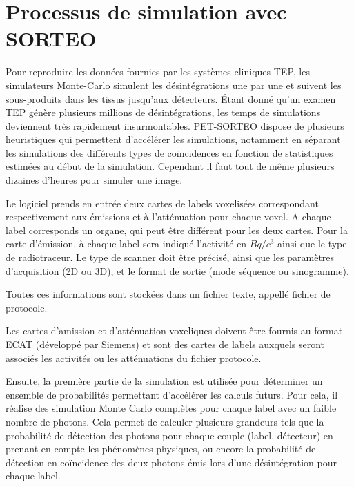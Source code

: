 	\section{Processus de simulation avec SORTEO}

Pour reproduire les données fournies par les systèmes cliniques TEP, les simulateurs Monte-Carlo simulent les désintégrations une par une et suivent les sous-produits dans les tissus jusqu'aux détecteurs. Étant donné qu'un examen TEP génère plusieurs millions de désintégrations, les temps de simulations deviennent très rapidement insurmontables. PET-SORTEO dispose de plusieurs heuristiques qui permettent d'accélérer les simulations, notamment en séparant les simulations des différents types de coïncidences en fonction de statistiques estimées au début de la simulation. Cependant il faut tout de même plusieurs dizaines d'heures pour simuler une image.

Le logiciel prends en entrée deux cartes de labels voxelisées correspondant respectivement aux émissions et à l'atténuation pour chaque voxel. A chaque label corresponds un organe, qui peut être différent pour les deux cartes. Pour la carte d'émission, à chaque label sera indiqué l'activité en $Bq/c^3$ ainsi que le type de radiotraceur. Le type de scanner doit être précisé, ainsi que les paramètres d'acquisition (2D ou 3D), et le format de sortie (mode séquence ou sinogramme).

Toutes ces informations sont stockées dans un fichier texte, appellé fichier de protocole.

Les cartes d'amission et d'atténuation voxeliques doivent être fournis au format ECAT (développé par Siemens) et sont des cartes de labels auxquels seront associés les activités ou les atténuations du fichier protocole.

Ensuite, la première partie de la simulation est utilisée pour déterminer un ensemble de probabilités permettant d'accélérer les calculs futurs. Pour cela, il réalise des simulation Monte Carlo complètes pour chaque label avec un faible nombre de photons. Cela permet de calculer plusieurs grandeurs tels que la probabilité de détection des photons pour chaque couple (label, détecteur) en prenant en compte les phénomènes physiques, ou encore la probabilité de détection en coïncidence des deux photons émis lors d'une désintégration pour chaque label.

